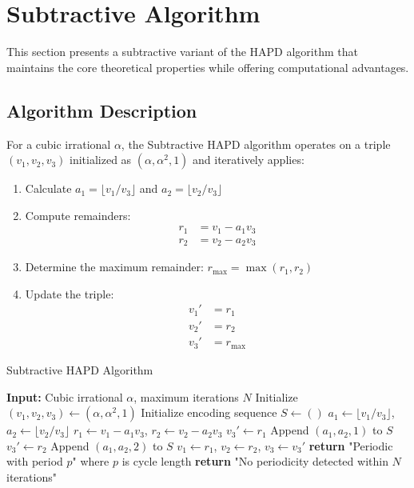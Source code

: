 \section{Subtractive Algorithm}\label{sec:subtractive_algorithm}

This section presents a subtractive variant of the HAPD algorithm that maintains the core theoretical properties while offering computational advantages.

\subsection{Algorithm Description}

\begin{definition}\label{def:subtractive_hapd}
For a cubic irrational $\alpha$, the Subtractive HAPD algorithm operates on a triple $(v_1, v_2, v_3)$ initialized as $(\alpha, \alpha^2, 1)$ and iteratively applies:

\begin{enumerate}
    \item Calculate $a_1 = \lfloor v_1/v_3 \rfloor$ and $a_2 = \lfloor v_2/v_3 \rfloor$
    \item Compute remainders: 
    \begin{align}
        r_1 &= v_1 - a_1v_3 \\
        r_2 &= v_2 - a_2v_3
    \end{align}
    \item Determine the maximum remainder: $r_{\text{max}} = \max(r_1, r_2)$
    \item Update the triple:
    \begin{align}
        v_1' &= r_1 \\
        v_2' &= r_2 \\
        v_3' &= r_{\text{max}}
    \end{align}
\end{enumerate}
\end{definition}

\begin{algorithm}[H]
\caption{Subtractive HAPD Algorithm}\label{alg:subtractive_hapd}
\begin{algorithmic}[1]
\State \textbf{Input:} Cubic irrational $\alpha$, maximum iterations $N$
\State Initialize $(v_1, v_2, v_3) \gets (\alpha, \alpha^2, 1)$
\State Initialize encoding sequence $S \gets ()$
    \State $a_1 \gets \lfloor v_1/v_3 \rfloor$, $a_2 \gets \lfloor v_2/v_3 \rfloor$
    \State $r_1 \gets v_1 - a_1v_3$, $r_2 \gets v_2 - a_2v_3$
        \State $v_3' \gets r_1$
        \State Append $(a_1, a_2, 1)$ to $S$
    \Else
        \State $v_3' \gets r_2$
        \State Append $(a_1, a_2, 2)$ to $S$
    \EndIf
    \State $v_1 \gets r_1$, $v_2 \gets r_2$, $v_3 \gets v_3'$
        \State \textbf{return} "Periodic with period $p$" where $p$ is cycle length
    \EndIf
\EndFor
\State \textbf{return} "No periodicity detected within $N$ iterations"
\end{algorithmic}
\end{algorithm}

